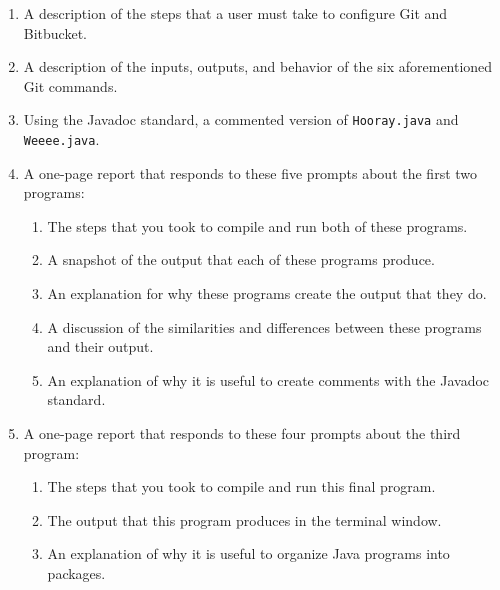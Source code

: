 \vspace*{-.05in}
\begin{enumerate}

  \itemsep 0em
  \item A description of the steps that a user must take to configure Git and Bitbucket.
  \item A description of the inputs, outputs, and behavior of the six aforementioned Git commands.
  \item Using the Javadoc standard, a commented version of {\tt Hooray.java} and {\tt Weeee.java}.

  \item A one-page report that responds to these five prompts about the first two programs:

    \vspace*{-.05in}
    \begin{enumerate}
      \itemsep 0em

      \item The steps that you took to compile and run both of these programs.

      \item A snapshot of the output that each of these programs produce.

      \item An explanation for why these programs create the output that they do.

      \item A discussion of the similarities and differences between these programs and their output.

      \item An explanation of why it is useful to create comments with the Javadoc standard.

    \end{enumerate}

  \item A one-page report that responds to these four prompts about the third program:

    \vspace*{-.05in}
    \begin{enumerate}
      \itemsep 0em

      \item The steps that you took to compile and run this final program.

      \item The output that this program produces in the terminal window.

      \item An explanation of why it is useful to organize Java programs into packages.


\end{enumerate}
\end{enumerate}
